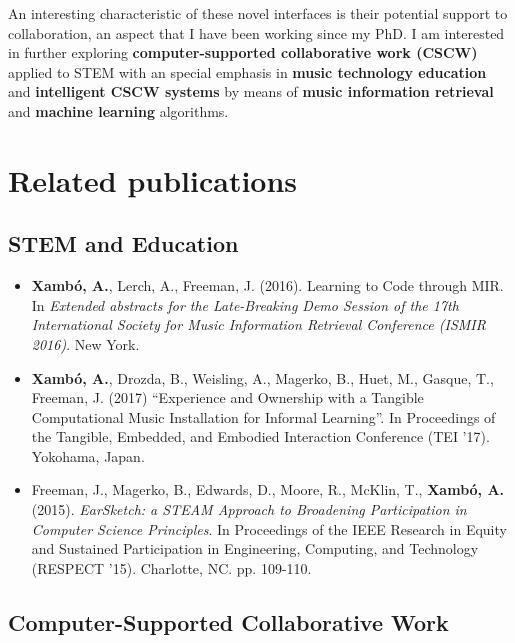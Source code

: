 \documentclass[10pt, a4paper]{article}
\begin{document}
An interesting characteristic of these novel interfaces is their potential support to collaboration, an aspect that I have been working since my PhD. I am interested in further exploring \textbf{computer-supported collaborative work (CSCW)} applied to STEM with an special emphasis in \textbf{music technology education} and \textbf{intelligent CSCW systems} by means of \textbf{music information retrieval} and \textbf{machine learning} algorithms.

\section*{Related publications}

\subsection*{STEM and Education}

\begin{itemize}
\item \textbf{Xambó, A.}, Lerch, A., Freeman, J. (2016). Learning to Code through MIR. In \emph{Extended abstracts for the Late-Breaking Demo Session of the 17th International Society for Music Information Retrieval Conference (ISMIR 2016)}. New York.
\item \textbf{Xambó, A.}, Drozda, B., Weisling, A., Magerko, B., Huet, M., Gasque, T., Freeman, J. (2017) “Experience and Ownership with a Tangible Computational Music Installation for Informal Learning”. In Proceedings of the Tangible, Embedded, and Embodied Interaction Conference (TEI ’17). Yokohama, Japan. 
\item Freeman, J., Magerko, B., Edwards, D., Moore, R., McKlin, T., \textbf{Xambó, A.} (2015). \emph{EarSketch: a STEAM Approach to Broadening Participation in Computer Science Principles}. In Proceedings of the IEEE Research in Equity and Sustained Participation in Engineering, Computing, and Technology (RESPECT '15). Charlotte, NC. pp. 109-110.
\end{itemize}

\subsection*{Computer-Supported Collaborative Work}
\end{document}
